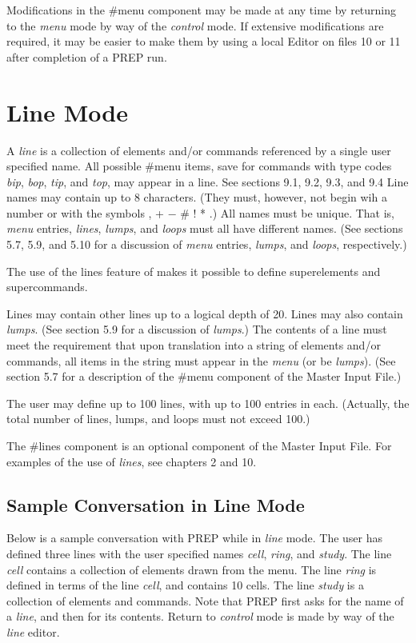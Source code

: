 Modifications in the \#menu component may be made at any time by returning
to the {\em menu} mode by way of the {\em control} mode. If extensive
modifications are required, it may be easier to make them by using a local
Editor on files 10 or 11 after completion of a PREP run.

\section{Line Mode}  A {\em line} is a collection of elements and/or
commands referenced by a single user specified name. All possible \#menu
items, save for commands with type codes {\em bip}, {\em bop}, {\em tip},
and {\em top}, may appear in a line. See sections 9.1, 9.2, 9.3, and 9.4
Line names may contain up to 8 characters. (They must, however, not begin
wih a number or with the symbols , + $-$ \# ! * .) All names must be
unique. That is, {\em menu} entries, {\em lines}, {\em lumps}, and {\em
loops} must all have different names. (See sections 5.7, 5.9, and 5.10 for
a discussion of {\em menu} entries, {\em lumps}, and {\em loops},
respectively.)

The use of the lines feature of \Mary makes it possible to define
superelements and supercommands.

Lines may contain other lines up to a logical depth of 20. Lines may also
contain {\em lumps}. (See section 5.9 for a discussion of {\em lumps}.) The
contents of a line must meet the requirement that upon translation into a
string of elements and/or commands, all items in the string must appear in
the {\em menu} (or be {\em lumps}). (See section 5.7 for a description of
the \#menu component of the Master Input File.)

The user may define up to 100 lines, with up to 100 entries in each.
(Actually, the total number of lines, lumps, and loops must not exceed
100.)

The \#lines component is an optional component of the Master Input File.
For examples of the use of {\em lines}, see chapters 2 and 10.

\subsection{Sample Conversation in Line Mode} Below is a sample
conversation with PREP while in {\em line} mode. The user has defined three
lines with the user specified names {\em cell}, {\em ring}, and {\em
study}. The line {\em cell} contains a collection of elements drawn from
the menu. The line {\em ring} is defined in terms of the line {\em cell},
and contains 10 cells. The line {\em study} is a collection of elements and
commands. Note that PREP first asks for the name of a {\em line}, and then
for its contents. Return to {\em control} mode is made by way of the {\em
line} editor.

